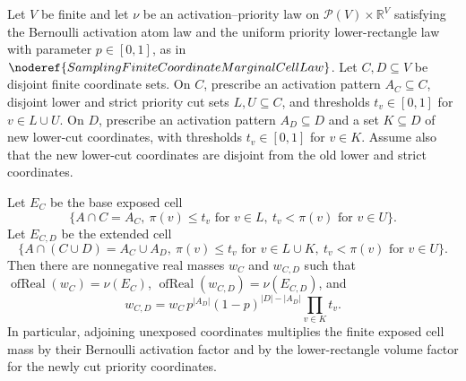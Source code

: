 \begin{helper}
Let \(V\) be finite and let \(\nu\) be an activation--priority law on
\(\mathcal P(V)\times\mathbb R^V\) satisfying the Bernoulli activation atom
law and the uniform priority lower-rectangle law with parameter \(p\in[0,1]\),
as in \(\noderef{SamplingFiniteCoordinateMarginalCellLaw}\).  Let
\(C,D\subseteq V\) be disjoint finite coordinate sets.  On \(C\), prescribe
an activation pattern \(A_C\subseteq C\), disjoint lower and strict priority
cut sets \(L,U\subseteq C\), and thresholds \(t_v\in[0,1]\) for
\(v\in L\cup U\).  On \(D\), prescribe an activation pattern
\(A_D\subseteq D\) and a set \(K\subseteq D\) of new lower-cut coordinates,
with thresholds \(t_v\in[0,1]\) for \(v\in K\).  Assume also that the new
lower-cut coordinates are disjoint from the old lower and strict coordinates.

Let \(E_C\) be the base exposed cell
\[
\{A\cap C=A_C,\ \pi(v)\le t_v\text{ for }v\in L,\ 
  t_v<\pi(v)\text{ for }v\in U\}.
\]
Let \(E_{C,D}\) be the extended cell
\[
\{A\cap(C\cup D)=A_C\cup A_D,\ 
  \pi(v)\le t_v\text{ for }v\in L\cup K,\ 
  t_v<\pi(v)\text{ for }v\in U\}.
\]
Then there are nonnegative real masses \(w_C\) and \(w_{C,D}\) such that
\(\operatorname{ofReal}(w_C)=\nu(E_C)\),
\(\operatorname{ofReal}(w_{C,D})=\nu(E_{C,D})\), and
\[
w_{C,D}
=w_C\,
  p^{|A_D|}(1-p)^{|D|-|A_D|}
  \prod_{v\in K} t_v .
\]
In particular, adjoining unexposed coordinates multiplies the finite exposed
cell mass by their Bernoulli activation factor and by the lower-rectangle
volume factor for the newly cut priority coordinates.
\end{helper}
